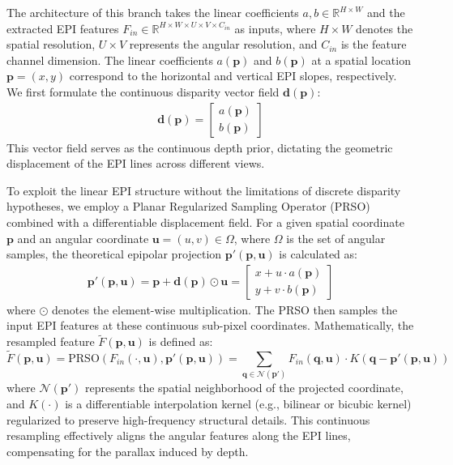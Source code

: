 The architecture of this branch takes the linear coefficients $a, b \in \mathbb{R}^{H \times W}$ and the extracted EPI features $F_{in} \in \mathbb{R}^{H \times W \times U \times V \times C_{in}}$ as inputs, where $H \times W$ denotes the spatial resolution, $U \times V$ represents the angular resolution, and $C_{in}$ is the feature channel dimension. The linear coefficients $a(\mathbf{p})$ and $b(\mathbf{p})$ at a spatial location $\mathbf{p} = (x,y)$ correspond to the horizontal and vertical EPI slopes, respectively. We first formulate the continuous disparity vector field $\mathbf{d}(\mathbf{p})$:
\begin{align}
\mathbf{d}(\mathbf{p}) = \begin{bmatrix} a(\mathbf{p}) \\ b(\mathbf{p}) \end{bmatrix}
\end{align}
This vector field serves as the continuous depth prior, dictating the geometric displacement of the EPI lines across different views.

To exploit the linear EPI structure without the limitations of discrete disparity hypotheses, we employ a Planar Regularized Sampling Operator (PRSO) combined with a differentiable displacement field. For a given spatial coordinate $\mathbf{p}$ and an angular coordinate $\mathbf{u} = (u,v) \in \Omega$, where $\Omega$ is the set of angular samples, the theoretical epipolar projection $\mathbf{p}'(\mathbf{p}, \mathbf{u})$ is calculated as:
\begin{align}
\mathbf{p}'(\mathbf{p}, \mathbf{u}) = \mathbf{p} + \mathbf{d}(\mathbf{p}) \odot \mathbf{u} = \begin{bmatrix} x + u \cdot a(\mathbf{p}) \\ y + v \cdot b(\mathbf{p}) \end{bmatrix}
\end{align}
where $\odot$ denotes the element-wise multiplication. The PRSO then samples the input EPI features at these continuous sub-pixel coordinates. Mathematically, the resampled feature $\tilde{F}(\mathbf{p}, \mathbf{u})$ is defined as:
\begin{equation}
\label{eq:eq9}
\tilde{F}(\mathbf{p}, \mathbf{u}) = \text{PRSO}(F_{in}(\cdot, \mathbf{u}), \mathbf{p}'(\mathbf{p}, \mathbf{u})) = \sum_{\mathbf{q} \in \mathcal{N}(\mathbf{p}')} F_{in}(\mathbf{q}, \mathbf{u}) \cdot K(\mathbf{q} - \mathbf{p}'(\mathbf{p}, \mathbf{u}))
\end{equation}
where $\mathcal{N}(\mathbf{p}')$ represents the spatial neighborhood of the projected coordinate, and $K(\cdot)$ is a differentiable interpolation kernel (e.g., bilinear or bicubic kernel) regularized to preserve high-frequency structural details. This continuous resampling effectively aligns the angular features along the EPI lines, compensating for the parallax induced by depth.

